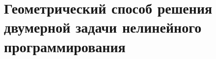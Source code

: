\documentclass[17pt]{extarticle}
\begin{document}
\section{Геометрический способ решения двумерной задачи нелинейного программирования}
\end{document}
